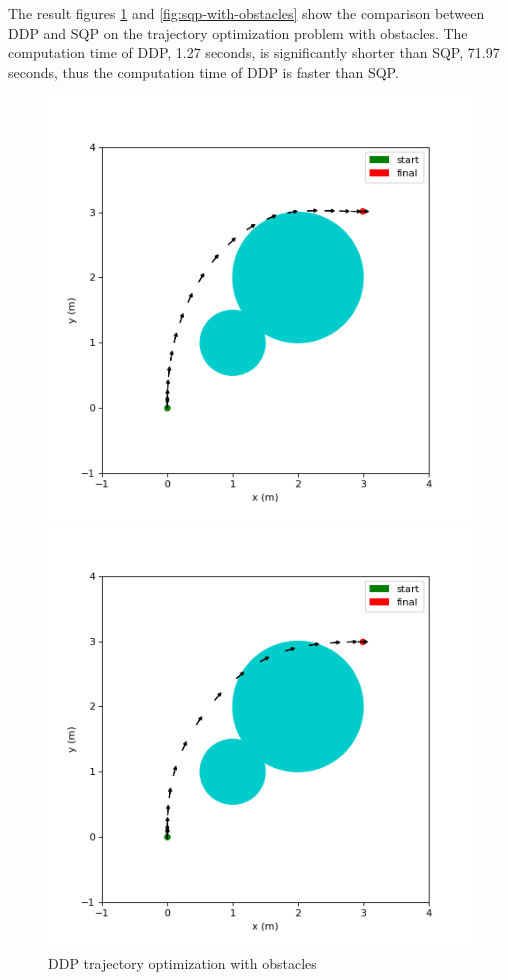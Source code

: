 \documentclass{article}
\begin{document}
The result figures \ref{fig:ddp-with-obstacles} and \ref{fig:sqp-with-obstacles} show the comparison between DDP and SQP on the trajectory optimization problem with obstacles. The computation time of DDP, 1.27 seconds, is significantly shorter than SQP, 71.97 seconds, thus the computation time of DDP is faster than SQP. 

\begin{figure}[h!]
    \begin{minipage}{0.4\textwidth}
        \centering
        \includegraphics[width=\textwidth]{images/with_obstacles.png}
        \caption{DDP trajectory optimization with obstacles}
        \label{fig:ddp-with-obstacles}
    \end{minipage}
    \hfill
    \begin{minipage}{0.4\textwidth}
        \centering
        \includegraphics[width=\textwidth]{images/sqp_T5_constrained.png}

\end{minipage}
\end{figure}
\end{document}
